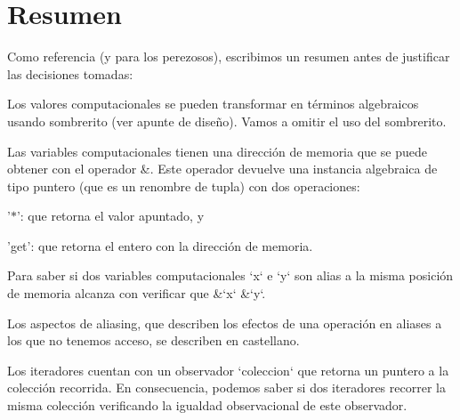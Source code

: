 \hypertarget{Aliasing_sec-Resumen}{}\section{\-Resumen}\label{Aliasing_sec-Resumen}
\-Como referencia (y para los perezosos), escribimos un resumen antes de justificar las decisiones tomadas\-:
\begin{DoxyItemize}
\item \-Los valores computacionales se pueden transformar en términos algebraicos usando sombrerito (ver apunte de diseño). \-Vamos a omitir el uso del sombrerito.
\item \-Las variables computacionales tienen una dirección de memoria que se puede obtener con el operador \&. \-Este operador devuelve una instancia algebraica de tipo puntero (que es un renombre de tupla) con dos operaciones\-:
\begin{DoxyEnumerate}
\item '$\ast$'\-: que retorna el valor apuntado, y
\item 'get'\-: que retorna el entero con la dirección de memoria.
\end{DoxyEnumerate}
\item \-Para saber si dos variables computacionales `x` e `y` son alias a la misma posición de memoria alcanza con verificar que \&`x`  \&`y`.
\item \-Los aspectos de aliasing, que describen los efectos de una operación en aliases a los que no tenemos acceso, se describen en castellano.
\item \-Los iteradores cuentan con un observador `coleccion` que retorna un puntero a la colección recorrida. \-En consecuencia, podemos saber si dos iteradores recorrer la misma colección verificando la igualdad observacional de este observador.
\end{DoxyItemize}

